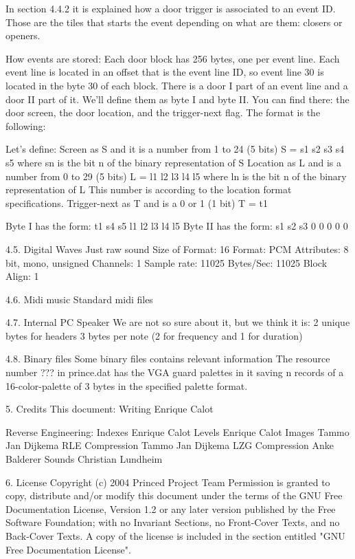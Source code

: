  In section 4.4.2 it is explained how a door trigger is associated to an
 event ID. Those are the tiles that starts the event depending on what are
 them: closers or openers.

 How events are stored:
 Each door block has 256 bytes, one per event line. Each event line is
 located in an offset that is the event line ID, so event line 30 is
 located in the byte 30 of each block.
 There is a door I part of an event line and a door II part of it. We'll
 define them as byte I and byte II.
 You can find there: the door screen, the door location, and the
 trigger-next flag. The format is the following:
 
 Let's define:
  Screen as S and it is a number from 1 to 24 (5 bits)
	 S = s1 s2 s3 s4 s5 where sn is the bit n of the binary representation of S
	Location as L and is a number from 0 to 29 (5 bits)
	 L = l1 l2 l3 l4 l5 where ln is the bit n of the binary representation of L
	 This number is according to the location format specifications.
	Trigger-next as T and is a 0 or 1 (1 bit)
   T = t1

 Byte I  has the form: t1 s4 s5 l1 l2 l3 l4 l5
 Byte II has the form: s1 s2 s3  0  0  0  0  0

4.5. Digital Waves
Just raw sound
 Size of Format: 16
 Format: PCM
 Attributes: 8 bit, mono, unsigned
 Channels: 1
 Sample rate: 11025
 Bytes/Sec: 11025
 Block Align: 1
 
4.6. Midi music
 Standard midi files

4.7. Internal PC Speaker
 We are not so sure about it, but we think it is:
  2 unique bytes for headers
  3 bytes per note (2 for frequency and 1 for duration)
 
4.8. Binary files
 Some binary files contains relevant information
 The resource number ??? in prince.dat has the VGA guard palettes in it
 saving n records of a 16-color-palette of 3 bytes in the specified palette
 format.

5. Credits
 This document:
  Writing                    Enrique Calot

 Reverse Engineering:
  Indexes                    Enrique Calot
  Levels                     Enrique Calot
  Images                 Tammo Jan Dijkema
  RLE Compression        Tammo Jan Dijkema
  LZG Compression            Anke Balderer
  Sounds                Christian Lundheim

6. License
      Copyright (c)  2004  Princed Project Team
      Permission is granted to copy, distribute and/or modify this document
      under the terms of the GNU Free Documentation License, Version 1.2
      or any later version published by the Free Software Foundation;
      with no Invariant Sections, no Front-Cover Texts, and no Back-Cover
      Texts.  A copy of the license is included in the section entitled "GNU
      Free Documentation License".
